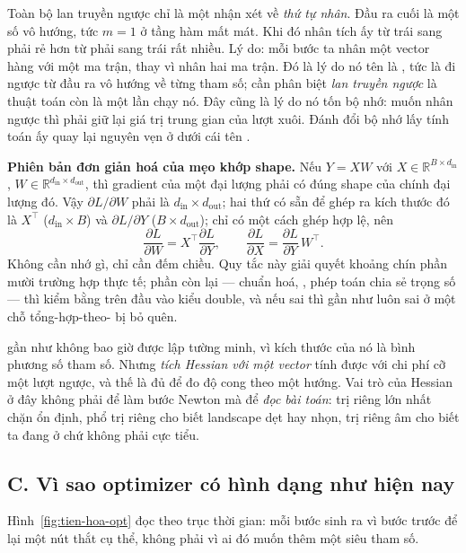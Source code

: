 \documentclass[../../../deep_learning.tex]{subfiles}
\begin{document}
Toàn bộ lan truyền ngược \cite{rumelhart1986} chỉ là một nhận xét về \emph{thứ tự nhân}. Đầu ra cuối là một số vô hướng, tức \(m=1\) ở tầng hàm mất mát. Khi đó nhân tích ấy từ trái sang phải rẻ hơn từ phải sang trái rất nhiều. Lý do: mỗi bước ta nhân một vector hàng với một ma trận, thay vì nhân hai ma trận. Đó là lý do nó tên là , tức là đi ngược từ đầu ra vô hướng về từng tham số; cần phân biệt \emph{lan truyền ngược} là thuật toán còn  là một lần chạy nó. Đây cũng là lý do nó tốn bộ nhớ: muốn nhân ngược thì phải giữ lại giá trị trung gian của lượt xuôi. Đánh đổi bộ nhớ lấy tính toán ấy quay lại nguyên vẹn ở  dưới cái tên  \cite{chen2016training}.


\textbf{Phiên bản đơn giản hoá của mẹo khớp shape.} Nếu \(Y = XW\) với \(X\in\mathbb{R}^{B\times d_{\text{in}}}\), \(W\in\mathbb{R}^{d_{\text{in}}\times d_{\text{out}}}\), thì gradient của một đại lượng phải có đúng shape của chính đại lượng đó. Vậy \(\partial L/\partial W\) phải là \(d_{\text{in}}\times d_{\text{out}}\); hai thứ có sẵn để ghép ra kích thước đó là \(X^\top\) (\(d_{\text{in}}\times B\)) và \(\partial L/\partial Y\) (\(B\times d_{\text{out}}\)); chỉ có một cách ghép hợp lệ, nên
\[
\frac{\partial L}{\partial W} = X^\top \frac{\partial L}{\partial Y},
\qquad
\frac{\partial L}{\partial X} = \frac{\partial L}{\partial Y}\,W^\top .
\]
Không cần nhớ gì, chỉ cần đếm chiều. Quy tắc này giải quyết khoảng chín phần mười trường hợp thực tế; phần còn lại --- chuẩn hoá, , phép toán chia sẻ trọng số --- thì kiểm bằng  trên đầu vào kiểu double, và nếu sai thì gần như luôn sai ở một chỗ tổng-hợp-theo- bị bỏ quên.

 gần như không bao giờ được lập tường minh, vì kích thước của nó là bình phương số tham số. Nhưng \emph{tích Hessian với một vector} tính được với chi phí cỡ một lượt ngược, và thế là đủ để đo độ cong theo một hướng. Vai trò của Hessian ở đây không phải để làm bước Newton mà để \emph{đọc bài toán}: trị riêng lớn nhất chặn  ổn định, phổ trị riêng cho biết landscape dẹt hay nhọn, trị riêng âm cho biết ta đang ở  chứ không phải cực tiểu.

\subsection{C. Vì sao optimizer có hình dạng như hiện nay}
Hình~\ref{fig:tien-hoa-opt} đọc theo trục thời gian: mỗi bước sinh ra vì bước trước để lại một nút thắt cụ thể, không phải vì ai đó muốn thêm một siêu tham số.
\end{document}
